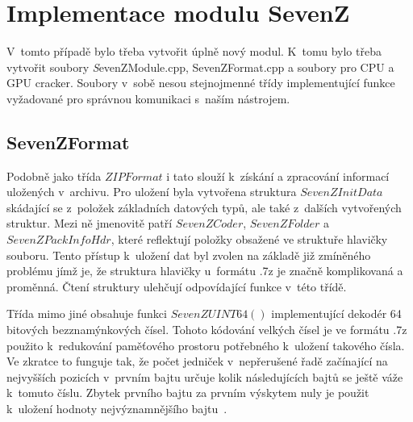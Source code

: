 %

\section{Implementace modulu SevenZ}
V~tomto případě bylo třeba vytvořit úplně nový modul. K~tomu bylo třeba vytvořit soubory {\textit
SevenZModule.cpp, SevenZFormat.cpp} a soubory pro CPU a GPU cracker. Soubory v~sobě nesou
stejnojmenné třídy implementující funkce vyžadované pro správnou komunikaci s~naším nástrojem.

\subsection{SevenZFormat}
Podobně jako třída $ZIPFormat$ i tato slouží k~získání a zpracování informací uložených
v~archivu. Pro uložení byla vytvořena struktura $SevenZInitData$ skádající se z~položek základních
datových typů, ale také z~dalších vytvořených struktur. Mezi ně jmenovitě patří $SevenZCoder$,
$SevenZFolder$ a $SevenZPackInfoHdr$, které reflektují položky obsažené ve struktuře hlavičky
souboru. Tento přístup k~uložení dat byl zvolen na základě již zmíněného problému jímž je, že
struktura hlavičky u~formátu .7z je značně komplikovaná a proměnná. Čtení struktury ulehčují
odpovídající funkce v~této třídě.

 Třída mimo jiné obsahuje funkci $SevenZUINT64()$ implementující dekodér 64 bitových
bezznamýnkových čísel. Tohoto kódování velkých čísel je ve formátu .7z použito k~redukování
paměťového prostoru potřebného k~uložení takového čísla. Ve zkratce to funguje tak, že počet
jedniček v~nepřerušené řadě začínající na nejvyšších pozicích v~prvním bajtu určuje kolik
následujících bajtů se ještě váže k~tomuto číslu. Zbytek prvního bajtu za prvním výskytem nuly je
použit k~uložení hodnoty nejvýznamnějšího bajtu~\cite{Pavlov:2010}. 

